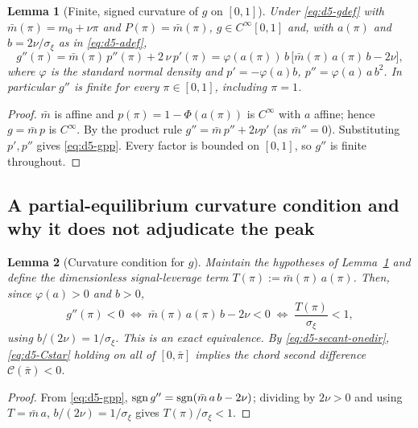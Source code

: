 \documentclass[11pt]{article}
\newtheorem{lemma}{Lemma}
\newcommand{\1}{\mathbf{1}}
\begin{document}
\begin{lemma}[Finite, signed curvature of $g$ on {$[0,1]$}]\label{lem:d5-chord}
Under \eqref{eq:d5-gdef} with $\bar m(\pi)=m_0+\nu\pi$ and $P(\pi)=\bar m(\pi)$, $g\in C^\infty[0,1]$ and, with $a(\pi)$ and $b=2\nu/\sigma_\xi$ as in \eqref{eq:d5-adef},
\begin{equation}\label{eq:d5-gpp}
  g''(\pi)=\bar m(\pi)\,p''(\pi)+2\,\nu\,p'(\pi)=\varphi(a(\pi))\,b\,\big[\bar m(\pi)\,a(\pi)\,b-2\nu\big],
\end{equation}
where $\varphi$ is the standard normal density and $p'=-\varphi(a)b$, $p''=\varphi(a)\,a\,b^{2}$. In particular $g''$ is finite for every $\pi\in[0,1]$, including $\pi=1$.
\end{lemma}
\begin{proof}
$\bar m$ is affine and $p(\pi)=1-\Phi(a(\pi))$ is $C^\infty$ with $a$ affine; hence $g=\bar m\,p$ is $C^\infty$. By the product rule $g''=\bar m\,p''+2\nu p'$ (as $\bar m''=0$). Substituting $p',p''$ gives \eqref{eq:d5-gpp}. Every factor is bounded on $[0,1]$, so $g''$ is finite throughout.
\end{proof}

\subsection{A partial-equilibrium curvature condition and why it does not adjudicate the peak}
\label{app:d5-Cstar}

\begin{lemma}[Curvature condition for $g$]\label{lem:d5-Cstar}
Maintain the hypotheses of Lemma~\ref{lem:d5-chord} and define the dimensionless signal-leverage term $T(\pi):=\bar m(\pi)\,a(\pi)$. Then, since $\varphi(a)>0$ and $b>0$,
\begin{equation}\label{eq:d5-Cstar}
  g''(\pi)<0\;\Longleftrightarrow\;\bar m(\pi)\,a(\pi)\,b-2\nu<0\;\Longleftrightarrow\;\frac{T(\pi)}{\sigma_\xi}<1,
\end{equation}
using $b/(2\nu)=1/\sigma_\xi$. This is an exact equivalence. By \eqref{eq:d5-secant-onedir}, \eqref{eq:d5-Cstar} holding on all of $[0,\bar\pi]$ implies the chord second difference $\mathcal C(\bar\pi)<0$.
\end{lemma}
\begin{proof}
From \eqref{eq:d5-gpp}, $\operatorname{sgn} g''=\operatorname{sgn}(\bar m\,a\,b-2\nu)$; dividing by $2\nu>0$ and using $T=\bar m\,a$, $b/(2\nu)=1/\sigma_\xi$ gives $T(\pi)/\sigma_\xi<1$.
\end{proof}
\end{document}
